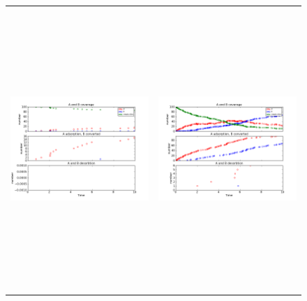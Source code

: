 \documentclass[11pt]{article}
\begin{document}
\setlength{\unitlength}{1in}
\begin{figure}[h!]
\begin{tabular}{cc}
\includegraphics[width=3.5in, height=4.2in]{./coadsorb_irreversible/AtoBirreversible10x10_101_desorb2x_Ea5E3_Ed10E3_3.png} &
\includegraphics[width=3.5in, height=4.2in]{./coadsorb_irreversible/AtoBirreversible10x10_201_desorb2x_Ea5E3_Ed10E3_3.png} \\

\end{tabular}
\end{figure}
\end{document}
